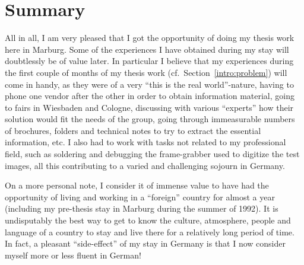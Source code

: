 
\section{Summary}
\label{concl:summary}

All in all, I am very pleased that I got the opportunity of doing my
thesis work here in Marburg.  Some of the experiences I have obtained
during my stay will doubtlessly be of value later.  In particular I
believe that my experiences during the first couple of months of my
thesis work (cf.\ Section~\ref{intro:problem}) will come in handy, as
they were of a very ``this is the real world''-nature, having to phone
one vendor after the other in order to obtain information material,
going to fairs in Wiesbaden and Cologne, discussing with various
``experts'' how their solution would fit the needs of the group, going
through immeasurable numbers of brochures, folders and technical notes
to try to extract the essential information, etc.  I also had to work
with tasks not related to my professional field, such as soldering and
debugging the frame-grabber used to digitize the test images, all this
contributing to a varied and challenging sojourn in Germany.

On a more personal note, I consider it of immense value to have had
the opportunity of living and working in a ``foreign'' country for
almost a year (including my pre-thesis stay in Marburg during the
summer of 1992).  It is undisputably the best way to get to know the
culture, atmosphere, people and language of a country to stay and live
there for a relatively long period of time.  In fact, a pleasant
``side-effect'' of my stay in Germany is that I now consider myself
more or less fluent in German!

